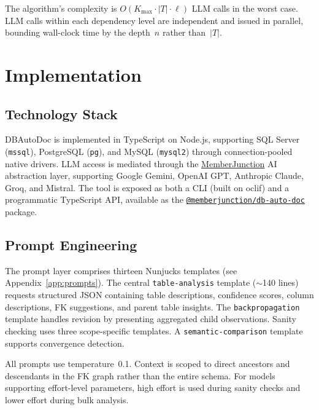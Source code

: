 \documentclass[sigconf, nonacm]{acmart}
\begin{document}
The algorithm's complexity is $O(K_{\max} \cdot |T| \cdot \ell)$ LLM calls in the worst case. LLM calls within each dependency level are independent and issued in parallel, bounding wall-clock time by the depth~$n$ rather than~$|T|$.


\section{Implementation}\label{sec:implementation}

\subsection{Technology Stack}

DBAutoDoc is implemented in TypeScript on Node.js, supporting SQL Server (\texttt{mssql}), PostgreSQL (\texttt{pg}), and MySQL (\texttt{mysql2}) through connection-pooled native drivers. LLM access is mediated through the \href{https://github.com/MemberJunction/MJ}{MemberJunction} AI abstraction layer, supporting Google Gemini, OpenAI GPT, Anthropic Claude, Groq, and Mistral. The tool is exposed as both a CLI (built on oclif) and a programmatic TypeScript API, available as the \href{https://github.com/MemberJunction/MJ/tree/next/packages/DBAutoDoc}{\texttt{@memberjunction/db-auto-doc}} package.

\subsection{Prompt Engineering}

The prompt layer comprises thirteen Nunjucks templates (see Appendix~\ref{app:prompts}). The central \texttt{table-analysis} template ($\sim$140 lines) requests structured JSON containing table descriptions, confidence scores, column descriptions, FK suggestions, and parent table insights. The \texttt{backpropagation} template handles revision by presenting aggregated child observations. Sanity checking uses three scope-specific templates. A \texttt{semantic-comparison} template supports convergence detection.

All prompts use temperature~0.1. Context is scoped to direct ancestors and descendants in the FK graph rather than the entire schema. For models supporting effort-level parameters, high effort is used during sanity checks and lower effort during bulk analysis.
\end{document}
